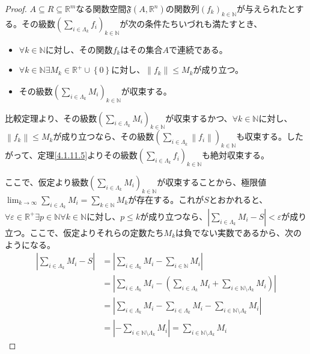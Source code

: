 \documentclass[dvipdfmx]{jsarticle}
\begin{document}
\begin{proof}
$A \subseteq R \subseteq \mathbb{R}^{m}$なる関数空間$\mathfrak{F}\left( A,\mathbb{R}^{n} \right)$の関数列$\left( f_{k} \right)_{k \in \mathbb{N}}$が与えられたとする。その級数$\left( \sum_{i \in \varLambda_{k}} f_{i} \right)_{k \in \mathbb{N}}$が次の条件たちいづれも満たすとき、
\begin{itemize}
\item
  $\forall k \in \mathbb{N}$に対し、その関数$f_{k}$はその集合$A$で連続である。
\item
  $\forall k \in \mathbb{N}\exists M_{k} \in \mathbb{R}^{+} \cup \left\{ 0 \right\}$に対し、$\left\| f_{k} \right\| \leq M_{k}$が成り立つ。
\item
  その級数$\left( \sum_{i \in \varLambda_{k}} M_{i} \right)_{k \in \mathbb{N}}$が収束する。
\end{itemize}
比較定理より、その級数$\left( \sum_{i \in \varLambda_{k}} M_{i} \right)_{k \in \mathbb{N}}$が収束するかつ、$\forall k \in \mathbb{N}$に対し、$\left\| f_{k} \right\| \leq M_{k}$が成り立つなら、その級数$\left( \sum_{i \in \varLambda_{k}} \left\| f_{i} \right\| \right)_{k \in \mathbb{N}}$も収束する。したがって、定理\ref{4.1.11.5}よりその級数$\left( \sum_{i \in \varLambda_{k}} f_{i} \right)_{k \in \mathbb{N}}$も絶対収束する。\par
ここで、仮定より級数$\left( \sum_{i \in \varLambda_{k}} M_{i} \right)_{k \in \mathbb{N}}$が収束することから、極限値$\lim_{k \rightarrow \infty}{\sum_{i \in \varLambda_{k}} M_{i}} = \sum_{k \in \mathbb{N}} M_{k}$が存在する。これが$S$とおかれると、$\forall\varepsilon \in \mathbb{R}^{+}\exists p \in \mathbb{N}\forall k \in \mathbb{N}$に対し、$p \leq k$が成り立つなら、$\left| \sum_{i \in \varLambda_{k}} M_{i} - S \right| < \varepsilon$が成り立つ。ここで、仮定よりそれらの定数たち$M_{k}$は負でない実数であるから、次のようになる。
\begin{align*}
\left| \sum_{i \in \varLambda_{k}} M_{i} - S \right| &= \left| \sum_{i \in \varLambda_{k}} M_{i} - \sum_{i \in \mathbb{N}} M_{i} \right|\\
&= \left| \sum_{i \in \varLambda_{k}} M_{i} - \left( \sum_{i \in \varLambda_{k}} M_{i} + \sum_{i \in \mathbb{N} \setminus \varLambda_{k}} M_{i} \right) \right|\\
&= \left| \sum_{i \in \varLambda_{k}} M_{i} - \sum_{i \in \varLambda_{k}} M_{i} - \sum_{i \in \mathbb{N} \setminus \varLambda_{k}} M_{i} \right|\\
&= \left| - \sum_{i \in \mathbb{N} \setminus \varLambda_{k}} M_{i} \right| = \sum_{i \in \mathbb{N} \setminus \varLambda_{k}} M_{i}

\end{align*}
\end{proof}
\end{document}
